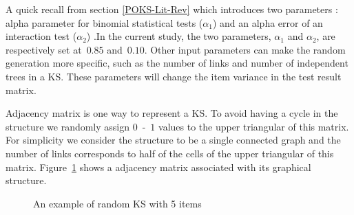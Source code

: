 A quick recall from section \ref{POKS-Lit-Rev} which introduces two parameters : alpha parameter for binomial statistical tests ($\alpha_1$) and an alpha error of an interaction test ($\alpha_2$) .In the current study, the two parameters, $\alpha_1$ and $\alpha_2$, are respectively set at~$0.85$ and~$0.10$. 
Other input parameters can make the random generation more specific, such as the number of links and number of independent trees in a KS. These parameters will change the item variance in the test result matrix. 

Adjacency matrix  is one way to represent a KS. To avoid having a cycle in the structure we randomly assign $0$~-~$1$ values to the upper triangular of this matrix. For simplicity we consider the structure to be a single connected graph and the number of links corresponds to half of the cells of the upper triangular of this matrix. Figure~\ref{fig:KSExample} shows a adjacency matrix associated with its graphical structure. 


\begin{figure}[h]
\centering 
{}
\qquad
\qquad
{}

\caption{An example of random KS with 5 items}
\label{fig:KSExample}
\end{figure}


